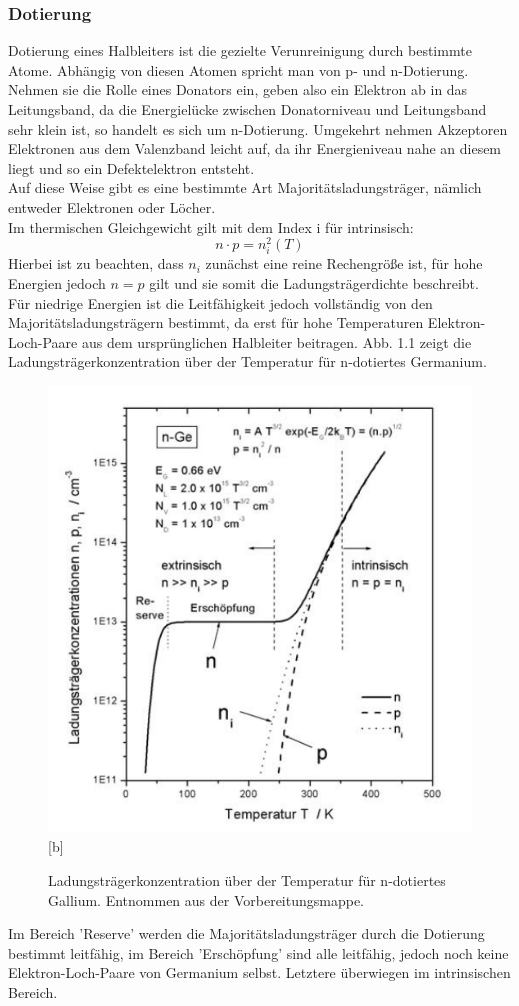 \newpage

\subsubsection{Dotierung}
Dotierung eines Halbleiters ist die gezielte Verunreinigung durch bestimmte Atome. Abhängig von diesen Atomen spricht man von p- und n-Dotierung. Nehmen sie die Rolle eines Donators ein, geben also ein Elektron ab in das Leitungsband, da die Energielücke zwischen Donatorniveau und Leitungsband sehr klein ist, so handelt es sich um n-Dotierung. Umgekehrt nehmen Akzeptoren Elektronen aus dem Valenzband leicht auf, da ihr Energieniveau nahe an diesem liegt und so ein Defektelektron entsteht. \\
Auf diese Weise gibt es eine bestimmte Art Majoritätsladungsträger, nämlich entweder Elektronen oder Löcher. \\
Im thermischen Gleichgewicht gilt mit dem Index i für intrinsisch:
$$ n \cdot p = n_i^{2} (T) $$
Hierbei ist zu beachten, dass $n_i$ zunächst eine reine Rechengröße ist, für hohe Energien jedoch $n = p$ gilt und sie somit die Ladungsträgerdichte beschreibt. \\
Für niedrige Energien ist die Leitfähigkeit jedoch vollständig von den Majoritätsladungsträgern bestimmt, da erst für hohe Temperaturen Elektron-Loch-Paare aus dem ursprünglichen Halbleiter beitragen. Abb. 1.1 zeigt die Ladungsträgerkonzentration über der Temperatur für n-dotiertes Germanium.
\begin{figure}
\centering
\includegraphics[scale=0.5]{./chap/Ladungstrkonz_temp.png}[b]
\caption{Ladungsträgerkonzentration über der Temperatur für n-dotiertes Gallium. Entnommen aus der Vorbereitungsmappe.}
\end{figure}
Im Bereich 'Reserve' werden die Majoritätsladungsträger durch die Dotierung bestimmt leitfähig, im Bereich 'Erschöpfung' sind alle leitfähig, jedoch noch keine Elektron-Loch-Paare von Germanium selbst. Letztere überwiegen im intrinsischen Bereich.
